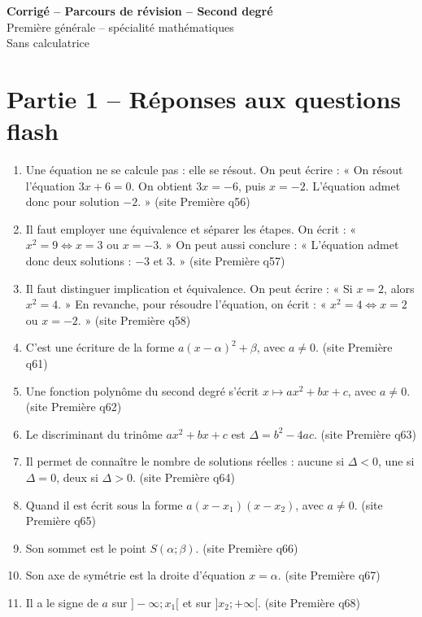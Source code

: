 \documentclass[11pt,a4paper]{article}
\newcommand{\sourceq}[1]{ {\scriptsize\textcolor{bleufonce}{(site Première q#1)}}}
\newcounter{question}
\newcounter{reponse}
\newenvironment{blocreponses}[1]{%
  \begin{tcolorbox}[enhanced,breakable,colback=bleuclair,colframe=bleufonce,boxrule=0.6pt,arc=2mm,left=2mm,right=2mm,top=2mm,bottom=1.5mm,title={\bfseries #1},coltitle=white,colbacktitle=bleufonce,before skip=3mm,after skip=3mm, fontupper=\large]
  \large
  \begin{enumerate}[leftmargin=*,label=\textbf{\arabic*.},itemsep=0.45em,topsep=0.5em]
  \setcounter{enumi}{\value{reponse}}
}{%
  \setcounter{reponse}{\value{enumi}}
  \end{enumerate}
  \end{tcolorbox}
}
\begin{document}
\begin{center}
{\LARGE\bfseries Corrigé -- Parcours de révision -- Second degré}\\[1mm]
{\large Première générale -- spécialité mathématiques}\\[1mm]
{\normalsize Sans calculatrice}
\end{center}
\vspace{2mm}
\tableofcontents
\clearpage

\section*{Partie 1 -- Réponses aux questions flash}
\setcounter{reponse}{0}
\begin{blocreponses}{Réponses -- Questions flash second degré}
  \item Une équation ne se calcule pas : elle se résout. On peut écrire : « On résout l’équation $3x+6=0$. On obtient $3x=-6$, puis $x=-2$. L’équation admet donc pour solution $-2$. » \sourceq{56}
  \item Il faut employer une équivalence et séparer les étapes. On écrit : « $x^2=9\Longleftrightarrow x=3$ ou $x=-3$. » On peut aussi conclure : « L’équation admet donc deux solutions : $-3$ et $3$. » \sourceq{57}
  \item Il faut distinguer implication et équivalence. On peut écrire : « Si $x=2$, alors $x^2=4$. » En revanche, pour résoudre l’équation, on écrit : « $x^2=4\Longleftrightarrow x=2$ ou $x=-2$. » \sourceq{58}
  \item C’est une écriture de la forme $a(x-\alpha)^2+\beta$, avec $a\neq 0$. \sourceq{61}
  \item Une fonction polynôme du second degré s’écrit $x\mapsto ax^2+bx+c$, avec $a\neq 0$. \sourceq{62}
  \item Le discriminant du trinôme $ax^2+bx+c$ est $\Delta=b^2-4ac$. \sourceq{63}
  \item Il permet de connaître le nombre de solutions réelles : aucune si $\Delta<0$, une si $\Delta=0$, deux si $\Delta>0$. \sourceq{64}
  \item Quand il est écrit sous la forme $a(x-x_1)(x-x_2)$, avec $a\neq 0$. \sourceq{65}
  \item Son sommet est le point $S(\alpha;\beta)$. \sourceq{66}
  \item Son axe de symétrie est la droite d’équation $x=\alpha$. \sourceq{67}
  \item Il a le signe de $a$ sur $]-\infty;x_1[$ et sur $]x_2;+\infty[$. \sourceq{68}

\end{blocreponses}
\end{document}
